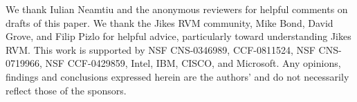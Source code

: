 \acks
We thank Iulian Neamtiu and the anonymous reviewers for helpful
comments on drafts of this paper.  We thank the Jikes RVM community, Mike
Bond, David Grove, and Filip Pizlo for helpful advice,
particularly toward understanding Jikes RVM\@.
This work is supported by NSF CNS-0346989, CCF-0811524, NSF CNS-0719966, NSF 
CCF-0429859, Intel, IBM, CISCO, and Microsoft. Any opinions, findings and
conclusions expressed herein are the authors' and do not necessarily
reflect those of the sponsors.
